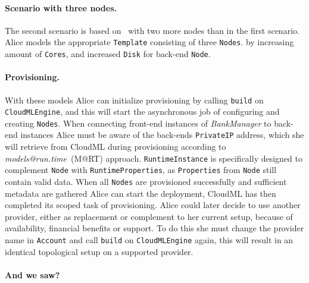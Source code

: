 \paragraph{Scenario with three nodes.}
The second scenario is based on~ with two more nodes than in the first scenario.
Alice models the appropriate \texttt{Template} consisting
of three \texttt{Nodes}.
by increasing amount of \texttt{Cores}, and increased \texttt{Disk} for back-end \texttt{Node}.

\paragraph{Provisioning.}
With these models Alice can initialize provisioning by calling 
\texttt{build} on \texttt{CloudMLEngine},
and this will start the asynchronous job of configuring and creating \texttt{Nodes}.
When connecting front-end instances of \emph{BankManager} to back-end instances Alice must 
be aware of the back-ends \texttt{PrivateIP} address, which she will retrieve from CloudML
during provisioning according to \emph{models@run.time}~(M@RT) approach.
\texttt{RuntimeInstance} is specifically designed to complement \texttt{Node} with \texttt{RuntimeProperties},
as \texttt{Properties} from \texttt{Node} still contain valid data.
When all \texttt{Nodes} are provisioned successfully and sufficient metadata are gathered
Alice can start the deployment, CloudML has then completed its scoped task of provisioning.
Alice could later decide to use another provider, either as replacement or complement to her current setup,
because of availability, financial benefits or support.
To do this she must change the provider name in \texttt{Account} and call \texttt{build} on \texttt{CloudMLEngine} again,
this will result in an identical topological setup on a supported provider.

\paragraph{And we saw?}

